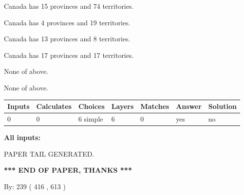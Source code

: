 \documentclass[12pt]{article}
\begin{document}
 
Canada has  15 provinces and  74 territories.
 
 
Canada has   4 provinces and  19 territories.
 
 
Canada has  13 provinces and  8 territories.
 
 
Canada has  17 provinces and  17 territories.
 
 
 None of above.
 
 
\noindent{}
 
 
 None of above.
 
 
\noindent{}
 
 
   
   
   
   
\noindent\begin{tabular}{|l|l|l|l|l|l|l|}
 \hline
Inputs & Calculates & Choices & Layers & Matches & Answer & Solution \\ \hline
 0  & 
 0  & 
 6
  simple  
  & 
 6  & 
 0  & 
  yes & 
  no 
  \\ \hline
 \end{tabular}
   
   
   
   
\noindent{}
   
   
   
   
\noindent\vspace{0.1in}\hspace{-0.08in} {\textbf{\Large{All inputs: }}}
   
   
   
   
   
   
 \vspace{0.2in}
 
   
   
\vspace{2.0in} PAPER TAIL GENERATED.
   
   
   
   
\vspace{1.0in} 
{\textbf{\large{ *** END OF PAPER, THANKS *** }}} 
   
   
\hspace{1.0in} By: 
 239 ( 416 ,  613 )
   
\end{document}
